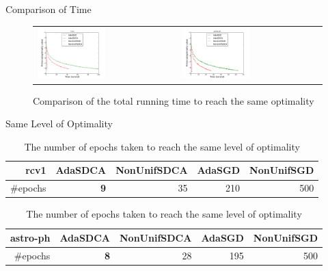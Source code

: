 \begin{frame}{Comparison of Time}
\begin{figure}[htbp]
\begin{tabular}{ll}
    \centering
        \includegraphics[width=0.5\textwidth]{images/comp_adas_time_rcv1.pdf} &
        \includegraphics[width=0.5\textwidth]{images/comp_adas_time_astro.pdf}
\end{tabular}
        \caption{Comparison of the total running time to reach the same optimality}
     \label{fig:adatime}
\end{figure}
\end{frame}

\begin{frame}{Same Level of Optimality}
\begin{table}[htbp]
    \centering
    \caption{The number of epochs taken to reach the same level of optimality}
    \label{table:timetable}
    \begin{tabular}{|r|r|r|r|r|}
        \hline 
        rcv1 & AdaSDCA & NonUnifSDCA & AdaSGD & NonUnifSGD \\
        \hline
        \#epochs & \textbf{9} & 35 & 210 & 500 \\         
        \hline
    \end{tabular}
    \begin{tabular}{|r|r|r|r|r|}
        \hline 
        astro-ph & AdaSDCA & NonUnifSDCA & AdaSGD & NonUnifSGD \\
        \hline
        \#epochs & \textbf{8} & 28 & 195 & 500 \\         
        \hline
    \end{tabular}    
\end{table}
\end{frame}

